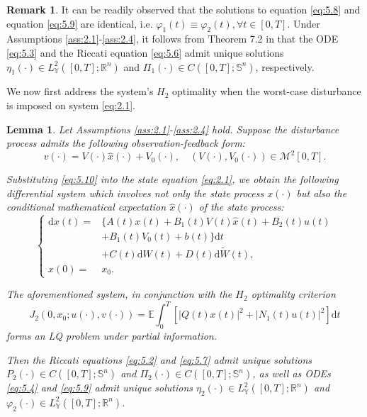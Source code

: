 \documentclass[lettersize,journal]{IEEEtran}
\theoremstyle{plain}
\newtheorem{lem}[thm]{Lemma}
\theoremstyle{definition}
\newtheorem{rmk}[thm]{Remark}
\begin{document}
\begin{rmk}
	It can be readily observed that the solutions to equation \eqref{eq:5.8} and equation \eqref{eq:5.9} are identical, i.e. $\varphi_1(t) \equiv \varphi_2(t), \forall t \in [0,T]$. Under Assumptions \ref{ass:2.1}-\ref{ass:2.4}, it follows from Theorem 7.2 in \cite{Yong1999} that the ODE \eqref{eq:5.3} and the Riccati equation \eqref{eq:5.6} admit unique solutions $\eta_1(\cdot) \in L_{\mathbb{Y}}^2([0,T];\mathbb{R}^n)$ and $\Pi_1(\cdot) \in C([0,T];\mathbb{S}^n)$, respectively.
\end{rmk}

We now first address the system's $H_2$ optimality when the worst-case disturbance is imposed on system \eqref{eq:2.1}.
\begin{lem}\label{lem:5.2}
	Let Assumptions \ref{ass:2.1}-\ref{ass:2.4} hold. Suppose the disturbance process admits the following observation-feedback form:
	\begin{equation}\label{eq:5.10}
		v(\cdot) = V(\cdot)\widehat{x}(\cdot) + V_0(\cdot), \quad(V(\cdot),V_0(\cdot)) \in \mathcal{M}^2[0,T].
	\end{equation}
	
	Substituting \eqref{eq:5.10} into the state equation \eqref{eq:2.1}, we obtain the following differential system which involves not only the state process $x(\cdot)$ but also the conditional mathematical expectation $\widehat{x}(\cdot)$ of the state process:
	\begin{equation}\label{eq:5.11}
		\left\{
		\begin{aligned}
			\mathrm{d}x(t) =& \Big\{ A(t)x(t) + B_1(t)V(t)\widehat{x}(t) + B_2(t)u(t) \\
			&+ B_1(t)V_0(t) + b(t) \Big\} \mathrm{d}t \\
			&+ C(t)\mathrm{d}W(t) + D(t)\mathrm{d}\widetilde{W}(t),\\
			x(0)=&x_0.
		\end{aligned}  
		\right.
	\end{equation}
	
	The aforementioned system, in conjunction with the $H_2$ optimality criterion \[J_2(0,x_0;u(\cdot),v(\cdot)) = \mathbb{E}\int_0^T [|Q(t)x(t)|^2 + |N_1(t)u(t)|^2] \mathrm{d}t\] forms an LQ problem under partial information.
	
	Then the Riccati equations \eqref{eq:5.2} and \eqref{eq:5.7} admit unique solutions $P_2(\cdot) \in C([0,T];\mathbb{S}^n)$ and $\Pi_2(\cdot) \in C([0,T];\mathbb{S}^n)$, as well as ODEs \eqref{eq:5.4} and \eqref{eq:5.9} admit unique solutions $\eta_2(\cdot) \in L_{\mathbb{Y}}^2([0,T];\mathbb{R}^n)$ and $\varphi_2(\cdot) \in L_{\mathbb{Y}}^2([0,T];\mathbb{R}^n)$.
	

\end{lem}
\end{document}
